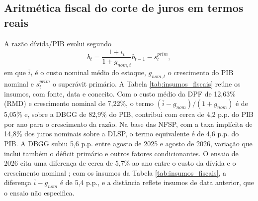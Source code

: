 \documentclass[12pt,a4paper]{article}
\begin{document}
\subsection{Aritmética fiscal do corte de juros em termos reais}

A razão dívida/PIB evolui segundo
\begin{equation}
b_t = \frac{1 + \bar{i}_t}{1 + g_{nom,t}} b_{t-1} - s_t^{prim},
\label{eq:debt_law}
\end{equation}
em que $\bar{i}_t$ é o custo nominal médio do estoque, $g_{nom,t}$ o crescimento do PIB nominal e $s_t^{prim}$ o superávit primário. A Tabela \ref{tab:insumos_fiscais} reúne os insumos, com fonte, data e conceito. Com o custo médio da DPF de 12,63\% (RMD) e crescimento nominal de 7,22\%, o termo $(\bar{i} - g_{nom})/(1+g_{nom})$ é de 5,05\% e, sobre a DBGG de 82,9\% do PIB, contribui com cerca de 4,2 p.p. do PIB por ano para o crescimento da razão. Na base das NFSP, com a taxa implícita de 14,8\% dos juros nominais sobre a DLSP, o termo equivalente é de 4,6 p.p. do PIB. A DBGG subiu 5,6 p.p. entre agosto de 2025 e agosto de 2026, variação que inclui também o déficit primário e outros fatores condicionantes. O ensaio de 2026 cita uma diferença de cerca de 5,7\% ao ano entre o custo da dívida e o crescimento nominal \citep[p.~4]{resende2026euacuso}; com os insumos da Tabela \ref{tab:insumos_fiscais}, a diferença $\bar{i} - g_{nom}$ é de 5,4 p.p., e a distância reflete insumos de data anterior, que o ensaio não especifica.
\end{document}
